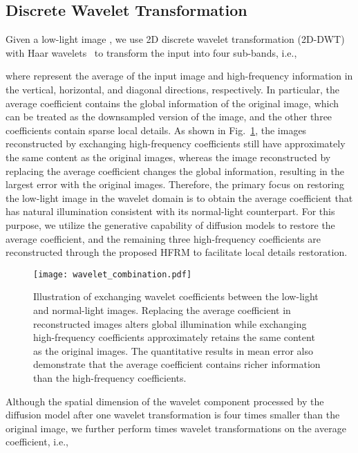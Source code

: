 \subsection{Discrete Wavelet Transformation}\label{subsec:Discrete Wavelet Transformation}
Given a low-light image , we use 2D discrete wavelet transformation (2D-DWT) with Haar wavelets~\cite{haar} to transform the input into four sub-bands, i.e.,

where  represent the average of the input image and high-frequency information in the vertical, horizontal, and diagonal directions, respectively. In particular, the average coefficient contains the global information of the original image, which can be treated as the downsampled version of the image, and the other three coefficients contain sparse local details. As shown in Fig.~\ref{fig:Wavelet_combination}, the images reconstructed by exchanging high-frequency coefficients still have approximately the same content as the original images, whereas the image reconstructed by replacing the average coefficient changes the global information, resulting in the largest error with the original images. Therefore, the primary focus on restoring the low-light image in the wavelet domain is to obtain the average coefficient that has natural illumination consistent with its normal-light counterpart. For this purpose, we utilize the generative capability of diffusion models to restore the average coefficient, and the remaining three high-frequency coefficients are reconstructed through the proposed HFRM to facilitate local details restoration.
\begin{figure}[!t]
	\centering
	\texttt{[image: wavelet\_combination.pdf]}
	\caption{Illustration of exchanging wavelet coefficients between the low-light and normal-light images. Replacing the average coefficient in reconstructed images alters global illumination while exchanging high-frequency coefficients approximately retains the same content as the original images. The quantitative results in mean error also demonstrate that the average coefficient contains richer information than the high-frequency coefficients.}
	\label{fig:Wavelet_combination}
\end{figure}

Although the spatial dimension of the wavelet component processed by the diffusion model after one wavelet transformation is four times smaller than the original image, we further perform  times wavelet transformations on the average coefficient, i.e.,

